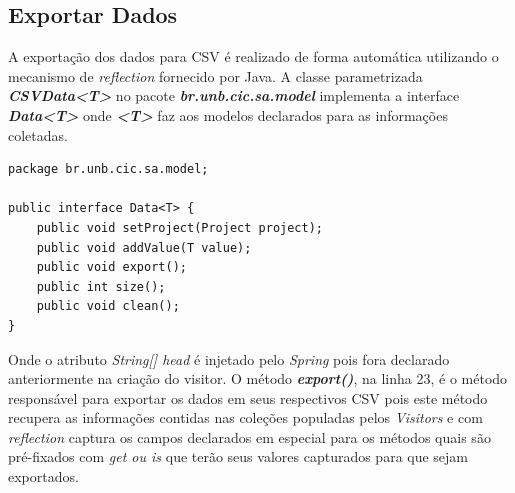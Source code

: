 \subsection{Exportar Dados}
A exportação dos dados para \acs{CSV} é realizado de forma automática utilizando o mecanismo de \textit{reflection} fornecido por Java. A classe parametrizada \textbf{\textit{CSVData<T>}} no pacote \textbf{\textit{br.unb.cic.sa.model}} implementa a interface \textit{\textbf{Data<T>}} onde \textbf{\textit{<T>}} faz  aos modelos declarados para as informações coletadas.

\begin{lstlisting}
package br.unb.cic.sa.model;

public interface Data<T> {
	public void setProject(Project project);
	public void addValue(T value);
	public void export();
	public int size();
	public void clean();
}
\end{lstlisting}


Onde o atributo \textit{String[] head} é injetado pelo \textit{Spring} pois fora declarado anteriormente na criação do visitor. O método \textbf\textit{{export()}}, na linha 23, é o método responsável para exportar os dados em seus respectivos \acs{CSV} pois este método recupera as informações contidas nas coleções populadas pelos \textit{Visitors} e com \textit{reflection} captura os campos declarados em especial para os métodos quais são pré-fixados com \textit{get ou is} que terão seus valores capturados para que sejam exportados.

